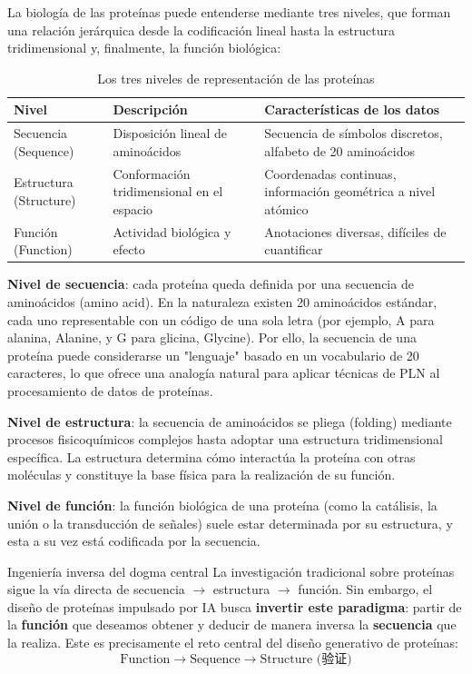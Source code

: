La biología de las proteínas puede entenderse mediante tres niveles, que forman una relación jerárquica desde la codificación lineal hasta la estructura tridimensional y, finalmente, la función biológica:

\begin{table}[H]
\centering
\caption{Los tres niveles de representación de las proteínas}
\begin{tabular}{@{}lll@{}}
\toprule
\textbf{Nivel} & \textbf{Descripción} & \textbf{Características de los datos} \\
\midrule
Secuencia (Sequence) & Disposición lineal de aminoácidos & Secuencia de símbolos discretos, alfabeto de 20 aminoácidos \\
Estructura (Structure) & Conformación tridimensional en el espacio & Coordenadas continuas, información geométrica a nivel atómico \\
Función (Function) & Actividad biológica y efecto & Anotaciones diversas, difíciles de cuantificar \\
\bottomrule
\end{tabular}
\end{table}

\textbf{Nivel de secuencia}: cada proteína queda definida por una secuencia de aminoácidos (amino acid). En la naturaleza existen 20 aminoácidos estándar, cada uno representable con un código de una sola letra (por ejemplo, A para alanina, Alanine, y G para glicina, Glycine). Por ello, la secuencia de una proteína puede considerarse un "lenguaje" basado en un vocabulario de 20 caracteres, lo que ofrece una analogía natural para aplicar técnicas de PLN al procesamiento de datos de proteínas.

\textbf{Nivel de estructura}: la secuencia de aminoácidos se pliega (folding) mediante procesos fisicoquímicos complejos hasta adoptar una estructura tridimensional específica. La estructura determina cómo interactúa la proteína con otras moléculas y constituye la base física para la realización de su función.

\textbf{Nivel de función}: la función biológica de una proteína (como la catálisis, la unión o la transducción de señales) suele estar determinada por su estructura, y esta a su vez está codificada por la secuencia.

\begin{importantbox}{Ingeniería inversa del dogma central}
La investigación tradicional sobre proteínas sigue la vía directa de secuencia $\rightarrow$ estructura $\rightarrow$ función. Sin embargo, el diseño de proteínas impulsado por IA busca \textbf{invertir este paradigma}: partir de la \textbf{función} que deseamos obtener y deducir de manera inversa la \textbf{secuencia} que la realiza. Este es precisamente el reto central del diseño generativo de proteínas:
$$\text{Function} \rightarrow \text{Sequence} \rightarrow \text{Structure (验证)}$$
\end{importantbox}

